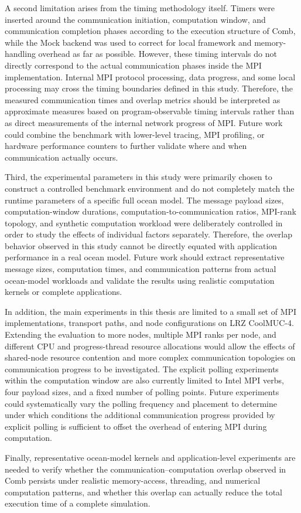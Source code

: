 A second limitation arises from the timing methodology itself. Timers were inserted around the communication initiation, computation window, and communication completion phases according to the execution structure of Comb, while the Mock backend was used to correct for local framework and memory-handling overhead as far as possible. However, these timing intervals do not directly correspond to the actual communication phases inside the MPI implementation. Internal MPI protocol processing, data progress, and some local processing may cross the timing boundaries defined in this study. Therefore, the measured communication times and overlap metrics should be interpreted as approximate measures based on program-observable timing intervals rather than as direct measurements of the internal network progress of MPI. Future work could combine the benchmark with lower-level tracing, MPI profiling, or hardware performance counters to further validate where and when communication actually occurs.

Third, the experimental parameters in this study were primarily chosen to construct a controlled benchmark environment and do not completely match the runtime parameters of a specific full ocean model. The message payload sizes, computation-window durations, computation-to-communication ratios, MPI-rank topology, and synthetic computation workload were deliberately controlled in order to study the effects of individual factors separately. Therefore, the overlap behavior observed in this study cannot be directly equated with application performance in a real ocean model. Future work should extract representative message sizes, computation times, and communication patterns from actual ocean-model workloads and validate the results using realistic computation kernels or complete applications.

In addition, the main experiments in this thesis are limited to a small set of MPI implementations, transport paths, and node configurations on LRZ CoolMUC-4. Extending the evaluation to more nodes, multiple MPI ranks per node, and different CPU and progress-thread resource allocations would allow the effects of shared-node resource contention and more complex communication topologies on communication progress to be investigated. The explicit polling experiments within the computation window are also currently limited to Intel MPI verbs, four payload sizes, and a fixed number of polling points. Future experiments could systematically vary the polling frequency and placement to determine under which conditions the additional communication progress provided by explicit polling is sufficient to offset the overhead of entering MPI during computation.

Finally, representative ocean-model kernels and application-level experiments are needed to verify whether the communication--computation overlap observed in Comb persists under realistic memory-access, threading, and numerical computation patterns, and whether this overlap can actually reduce the total execution time of a complete simulation.

